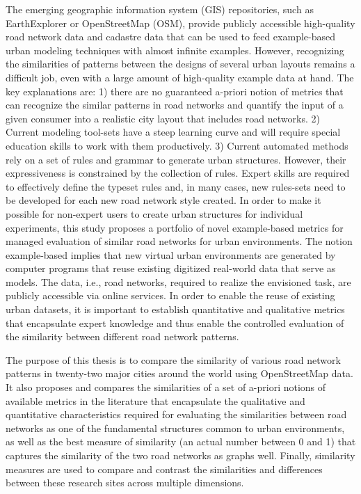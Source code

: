
The emerging geographic information system (GIS) repositories, such as EarthExplorer or OpenStreetMap (OSM), provide publicly accessible high-quality road network data and cadastre data that can be used to feed example-based urban modeling techniques with almost infinite examples. However, recognizing the similarities of patterns between the designs of several urban layouts remains a difficult job, even with a large amount of high-quality example data at hand. The key explanations are: 1) there are no guaranteed a-priori notion of metrics that can recognize the similar patterns in road networks and quantify the input of a given consumer into a realistic city layout that includes road networks. 2) Current modeling tool-sets have a steep learning curve and will require special education skills to work with them productively. 3) Current automated methods rely on a set of rules and grammar to generate urban structures. However, their expressiveness is constrained by the collection of rules. Expert skills are required to effectively define the typeset rules and, in many cases, new rules-sets need to be developed for each new road network style created. In order to make it possible for non-expert users to create urban structures for individual experiments, this study proposes a portfolio of novel example-based metrics for managed evaluation of similar road networks for urban environments. The notion example-based implies that new virtual urban environments are generated by computer programs that reuse existing digitized real-world data that serve as models. The data, i.e., road networks, required to realize the envisioned task, are publicly accessible via online services. In order to enable the reuse of existing urban datasets, it is important to establish quantitative and qualitative metrics that encapsulate expert knowledge and thus enable the controlled evaluation of the similarity between different road network patterns.  

The purpose of this thesis is to compare the similarity of various road network patterns in twenty-two major cities around the world using OpenStreetMap data. It also proposes and compares the similarities of a set of a-priori notions of available metrics in the literature that encapsulate the qualitative and quantitative characteristics required for evaluating the similarities between road networks as one of the fundamental structures common to urban environments, as well as the best measure of similarity (an actual number between 0 and 1) that captures the similarity of the two road networks as graphs well. Finally, similarity measures are used to compare and contrast the similarities and differences between these research sites across multiple dimensions.

